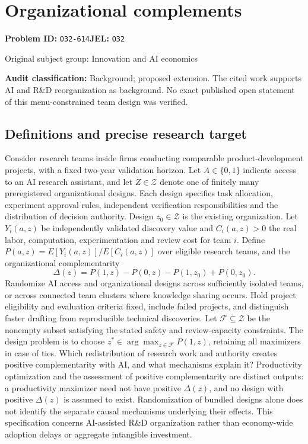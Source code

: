 \documentclass[11pt,a4paper]{article}
\begin{document}
\section*{Organizational complements}
\textbf{Problem ID:} \texttt{O32-614}\quad \textbf{JEL:} \texttt{O32}\par
\label{problem:OP-0414}
{\sffamily\small\color{muted}Original subject group: Innovation and AI economics\par}
\label{definitions:problem:30007696}
\textbf{Audit classification:} Background; proposed extension. The cited work supports AI and R\&D reorganization as background. No exact published open statement of this menu-constrained team design was verified.
\subsection*{Definitions and precise research target}
Consider research teams inside firms conducting comparable product-development projects, with a fixed two-year validation horizon. Let \(A\in\{0,1\}\) indicate access to an AI research assistant, and let \(Z\in\mathcal Z\) denote one of finitely many preregistered organizational designs. Each design specifies task allocation, experiment approval rules, independent verification responsibilities and the distribution of decision authority. Design \(z_0\in\mathcal Z\) is the existing organization. Let \(Y_i(a,z)\) be independently validated discovery value and \(C_i(a,z)>0\) the real labor, computation, experimentation and review cost for team \(i\). Define \(P(a,z)=E[Y_i(a,z)]/E[C_i(a,z)]\) over eligible research teams, and the organizational complementarity
\[
\Delta(z)=P(1,z)-P(0,z)-P(1,z_0)+P(0,z_0).
\]
Randomize AI access and organizational designs across sufficiently isolated teams, or across connected team clusters where knowledge sharing occurs. Hold project eligibility and evaluation criteria fixed, include failed projects, and distinguish faster drafting from reproducible technical discoveries. Let \(\mathcal F\subseteq\mathcal Z\) be the nonempty subset satisfying the stated safety and review-capacity constraints. The design problem is to choose \(z^\ast\in\arg\max_{z\in\mathcal F}P(1,z)\), retaining all maximizers in case of ties. Which redistribution of research work and authority creates positive complementarity with AI, and what mechanisms explain it? Productivity optimization and the assessment of positive complementarity are distinct outputs: a productivity maximizer need not have positive \(\Delta(z)\), and no design with positive \(\Delta(z)\) is assumed to exist. Randomization of bundled designs alone does not identify the separate causal mechanisms underlying their effects. This specification concerns AI-assisted R\&D organization rather than economy-wide adoption delays or aggregate intangible investment.
\end{document}
